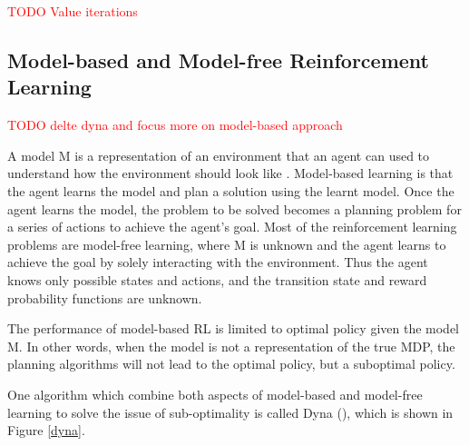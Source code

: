 \documentclass[12pt,twoside]{report}
\theoremstyle{plain}
\theoremstyle{definition}
\DeclareMathOperator{\E}{\mathbb{E}}
\begin{document}


%
%
%
%

\textcolor{red}{TODO Value iterations}

\subsection{Model-based and Model-free Reinforcement Learning}
\label{model_base_model_free_subsection}

\textcolor{red}{TODO delte dyna and focus more on model-based approach}

A model M is a representation of an environment that an agent can used to understand how the environment should look like . Model-based learning is that the agent learns the model and plan a solution using the learnt model. Once the agent learns the model, the problem to be solved becomes a planning problem for a series of actions to achieve the agent's goal.
Most of the reinforcement learning problems are model-free learning, where M is unknown and the agent learns to achieve the goal by solely interacting with the environment. Thus the agent knows only possible states and actions, and the transition state and reward probability functions are unknown.

The performance of model-based RL is limited to optimal policy given the model M. In other words, when the model is not a representation of the true MDP, the planning algorithms will not lead to the optimal policy, but a suboptimal policy.

One algorithm which combine both aspects of model-based and model-free learning to solve the issue of sub-optimality is called Dyna (\cite{Sutton1990}), which is shown in Figure \ref{dyna}.
\end{document}
